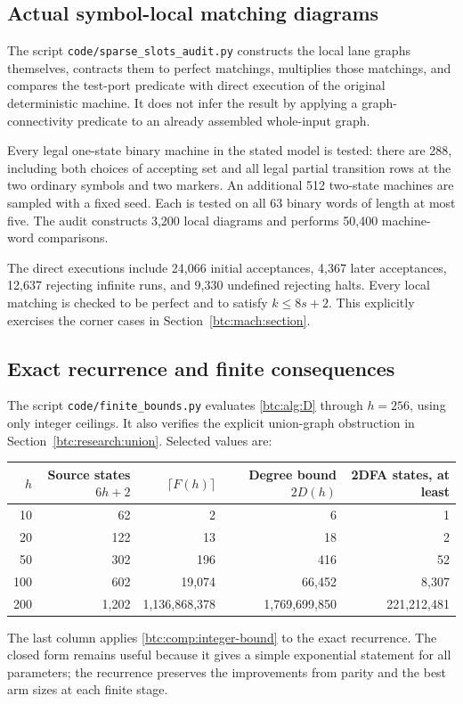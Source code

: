 \subsection{Actual symbol-local matching diagrams}

The script \texttt{code/sparse\_slots\_audit.py} constructs the
local lane graphs themselves, contracts them to perfect matchings,
multiplies those matchings, and compares the test-port predicate
with direct execution of the original deterministic machine.
It does not infer the result by applying a graph-connectivity
predicate to an already assembled whole-input graph.

Every legal one-state binary machine in the stated model is
tested: there are 288, including both choices of accepting set
and all legal partial transition rows at the two ordinary symbols
and two markers. An additional 512 two-state machines are sampled
with a fixed seed. Each is tested on all 63 binary words of
length at most five. The audit constructs 3,200 local diagrams
and performs 50,400 machine-word comparisons.

The direct executions include 24,066 initial acceptances, 4,367
later acceptances, 12,637 rejecting infinite runs, and 9,330
undefined rejecting halts. Every local matching is checked to
be perfect and to satisfy $k\le8s+2$. This explicitly exercises
the corner cases in Section~\ref{btc:mach:section}.

\subsection{Exact recurrence and finite consequences}

The script \texttt{code/finite\_bounds.py} evaluates
\eqref{btc:alg:D} through $h=256$, using only integer ceilings.
It also verifies the explicit union-graph obstruction in
Section~\ref{btc:research:union}. Selected values are:
\begin{center}
\small
\begin{tabular}{rrrrr}
\toprule
$h$ & Source states $6h+2$ & $\lceil F(h)\rceil$
 & Degree bound $2D(h)$ & 2DFA states, at least\\
\midrule
10 & 62 & 2 & 6 & 1\\
20 & 122 & 13 & 18 & 2\\
50 & 302 & 196 & 416 & 52\\
100 & 602 & 19,074 & 66,452 & 8,307\\
200 & 1,202 & 1,136,868,378 & 1,769,699,850 & 221,212,481\\
\bottomrule
\end{tabular}
\end{center}
The last column applies \eqref{btc:comp:integer-bound} to the exact
recurrence. The closed form remains useful because it gives a
simple exponential statement for all parameters; the recurrence
preserves the improvements from parity and the best arm sizes
at each finite stage.


